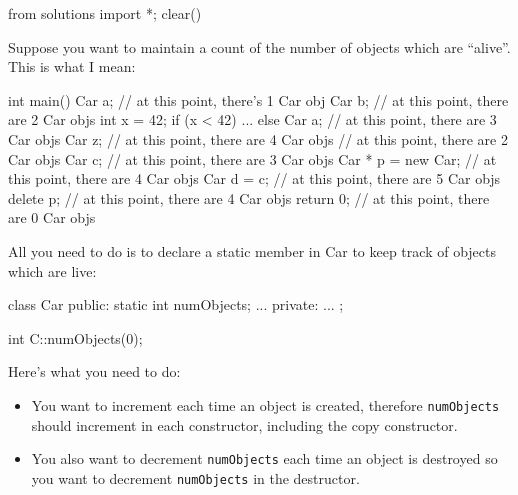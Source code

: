 \begin{python0}
from solutions import *; clear()
\end{python0}

Suppose you want to maintain a count of the number of objects which are
``alive''. This is what I mean:

\begin{consolethree}[escapeinside=||]
int main()
{
    Car a; // at this point, there's 1 Car obj
    Car b; // at this point, there are 2 Car objs
    int x = 42;
    if (x < 42)
    {
        ...
    }
    else
    {
        Car a; // at this point, there are 3 Car objs
        Car z; // at this point, there are 4 Car objs
    }
    // at this point, there are 2 Car objs
    Car c; // at this point, there are 3 Car objs
    Car * p = new Car;
    // at this point, there are 4 Car objs
    Car d = c; // at this point, there are 5 Car objs
    delete p; // at this point, there are 4 Car objs
    return 0; // at this point, there are 0 Car objs
}
\end{consolethree}

All you need to do is to declare a static member in Car to keep track of
objects which are live:

\begin{consolethree}[escapeinside=||]
class Car
{
public:
    static int numObjects;
    ...
private:
    ...
};

int C::numObjects(0);
\end{consolethree}

Here's what you need to do:

\begin{itemize}
\item You want to increment each time an object is created, therefore
  \texttt{numObjects} should increment in each constructor, including the
  copy constructor.
\item You also want to decrement \texttt{numObjects} each time an object is
  destroyed so you want to decrement \texttt{numObjects} in the
  destructor.
\end{itemize}



